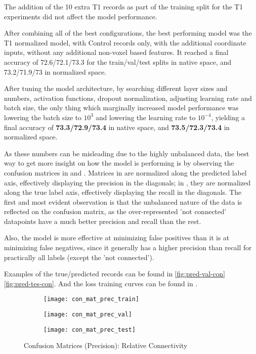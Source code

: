 The addition of the 10 extra T1 records as part of the training split for the T1 experiments did not affect the model performance.\par
After combining all of the best configurations, the best performing model was the T1 normalized model, with Control records only, with the additional coordinate inputs, without any additional non-voxel based features. It reached a final accuracy of 72.6/72.1/73.3 for the train/val/test splits in native space, and 73.2/71.9/73 in normalized space.\par
After tuning the model architecture, by searching different layer sizes and numbers, activation functions, dropout normalization, adjusting learning rate and batch size, the only thing which marginally increased model performance was lowering the batch size to $10^3$ and lowering the learning rate to $10^{-4}$, yielding a final accuracy of \textbf{73.3/72.9/73.4} in native space, and \textbf{73.5/72.3/73.4} in normalized space.\par
As these numbers can be misleading due to the highly unbalanced data, the best way to get more insight on how the model is performing is by observing the confusion matrices in  and . Matrices in  are normalized along the predicted label axis, effectively displaying the precision in the diagonals; in , they are normalized along the true label axis, effectively displaying the recall in the diagonals. The first and most evident observation is that the unbalanced nature of the data is reflected on the confusion matrix, as the over-represented 'not connected' datapoints have a much better precision and recall than the rest.\par
Also, the model is more effective at minimizing false positives than it is at minimizing false negatives, since it generally has a higher precision than recall for practically all labels (except the 'not connected').\par
Examples of the true/predicted records can be found in  \ref{fig:pred-val-con} \ref{fig:pred-tes-con}. And the loss training curves can be found in .

\begin{figure}[H]
\centering
\begin{subfigure}{0.49\textwidth}
  \centering
  \texttt{[image: con\_mat\_prec\_train]}
\end{subfigure}
\hfill
\begin{subfigure}{0.49\textwidth}
  \centering
  \texttt{[image: con\_mat\_prec\_val]}
\end{subfigure}
\begin{subfigure}{0.49\textwidth}
  \centering
  \texttt{[image: con\_mat\_prec\_test]}
\end{subfigure}
\caption{Confusion Matrices (Precision): Relative Connectivity}
\label{fig:conf_prec}
\end{figure}

